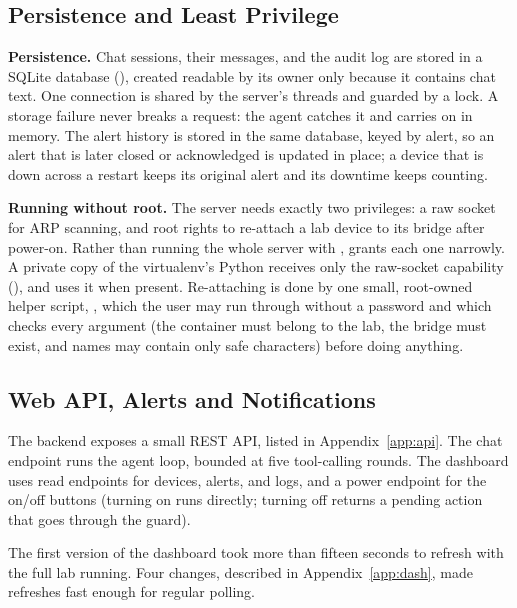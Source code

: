 \subsection{Persistence and Least Privilege}

\textbf{Persistence.} Chat sessions, their messages, and the audit log are
stored in a SQLite database (), created readable by its
owner only because it contains chat text. One connection is shared by the
server's threads and guarded by a lock. A storage failure never breaks a
request: the agent catches it and carries on in memory. The alert history is
stored in the same database, keyed by alert, so an alert that is later closed
or acknowledged is updated in place; a device that is down across a restart
keeps its original alert and its downtime keeps counting.

\textbf{Running without root.} The server needs exactly two privileges: a raw
socket for ARP scanning, and root rights to re-attach a lab device to its
bridge after power-on. Rather than running the whole server with
,  grants each one narrowly. A private copy
of the virtualenv's Python receives only the raw-socket capability
(), and  uses it when present. Re-attaching
is done by one small, root-owned helper script, ,
which the user may run through  without a password and which
checks every argument (the container must belong to the lab, the bridge must
exist, and names may contain only safe characters) before doing anything.

\subsection{Web API, Alerts and Notifications}

The backend exposes a small REST API, listed in Appendix~\ref{app:api}. The
chat endpoint runs the agent loop, bounded at five tool-calling rounds. The
dashboard uses read endpoints for devices, alerts, and logs, and a power
endpoint for the on/off buttons (turning on runs directly; turning off returns
a pending action that goes through the guard).

The first version of the dashboard took more than fifteen seconds to refresh
with the full lab running. Four changes, described in
Appendix~\ref{app:dash}, made refreshes fast enough for regular polling.

